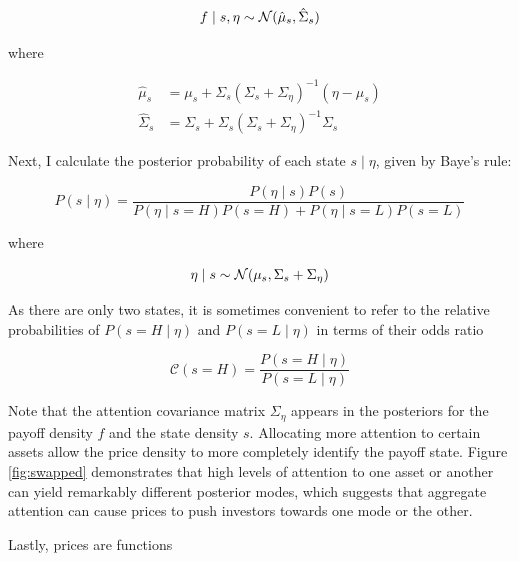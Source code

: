 \documentclass{article}
\begin{document}
$$
f \mid s, \eta \sim \mathcal{N}(\hat \mu_s, \hat \Sigma_s)
$$

\noindent where 

\begin{align*}
    \hat \mu_s &= 
        \mu_s + \Sigma_s(\Sigma_s + \Sigma_\eta)^{-1} (\eta - \mu_s) \\
    \hat \Sigma_s &= 
        \Sigma_s + \Sigma_s(\Sigma_s + \Sigma_\eta)^{-1} \Sigma_s
\end{align*}

Next, I calculate the posterior probability of each state $s \mid \eta$, given by Baye's rule:

$$
P(s \mid \eta) = \frac{P(\eta \mid s) P(s)}{
    P(\eta \mid s=H)P(s=H) + P(\eta \mid s=L)P(s=L)
}
$$

where 

$$
\eta \mid s \sim \mathcal{N}(\mu_s, \Sigma_s + \Sigma_\eta)
$$

\noindent As there are only two states, it is sometimes convenient to refer to the relative probabilities of $P(s=H\mid \eta)$ and $P(s=L \mid \eta)$ in terms of their odds ratio

$$
\mathcal{C}(s=H) = \frac{P(s=H \mid \eta)}{P(s=L \mid \eta)}
$$

Note that the attention covariance matrix $\Sigma_\eta$ appears in the posteriors for the payoff density $f$ and the state density $s$. Allocating more attention to certain assets allow the price density to more completely identify the payoff state. Figure \ref{fig:swapped} demonstrates that high levels of attention to one asset or another can yield remarkably different posterior modes, which suggests that aggregate attention can cause prices to push investors towards one mode or the other.

Lastly, prices are functions 

\end{document}
